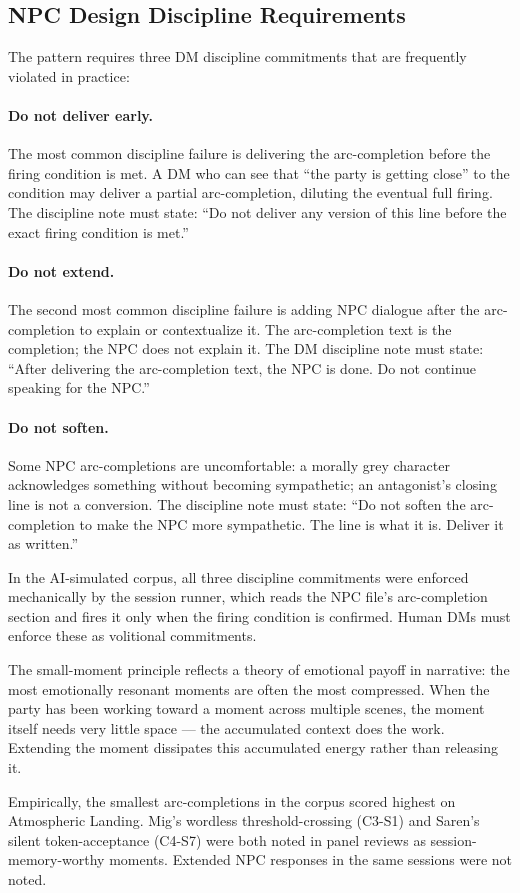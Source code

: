 \subsection{NPC Design Discipline Requirements}

The pattern requires three DM discipline commitments that are frequently violated
in practice:

\paragraph{Do not deliver early.}
The most common discipline failure is delivering the arc-completion before the firing
condition is met. A DM who can see that ``the party is getting close'' to the condition
may deliver a partial arc-completion, diluting the eventual full firing. The discipline
note must state: ``Do not deliver any version of this line before the exact firing
condition is met.''

\paragraph{Do not extend.}
The second most common discipline failure is adding NPC dialogue after the arc-completion
to explain or contextualize it. The arc-completion text is the completion; the NPC
does not explain it. The DM discipline note must state: ``After delivering the arc-completion
text, the NPC is done. Do not continue speaking for the NPC.''

\paragraph{Do not soften.}
Some NPC arc-completions are uncomfortable: a morally grey character acknowledges
something without becoming sympathetic; an antagonist's closing line is not a conversion.
The discipline note must state: ``Do not soften the arc-completion to make the NPC
more sympathetic. The line is what it is. Deliver it as written.''

In the AI-simulated corpus, all three discipline commitments were enforced
mechanically by the session runner, which reads the NPC file's arc-completion
section and fires it only when the firing condition is confirmed. Human DMs must
enforce these as volitional commitments.

The small-moment principle reflects a theory of emotional payoff in narrative: the
most emotionally resonant moments are often the most compressed. When the party has
been working toward a moment across multiple scenes, the moment itself needs very
little space --- the accumulated context does the work. Extending the moment dissipates
this accumulated energy rather than releasing it.

Empirically, the smallest arc-completions in the corpus scored highest on Atmospheric
Landing. Mig's wordless threshold-crossing (C3-S1) and Saren's silent token-acceptance
(C4-S7) were both noted in panel reviews as session-memory-worthy moments. Extended
NPC responses in the same sessions were not noted.
